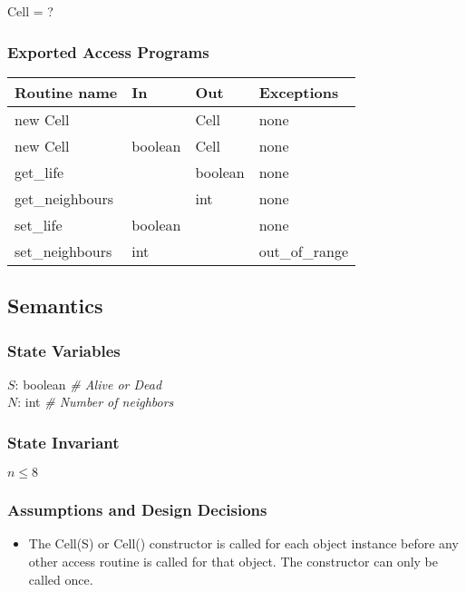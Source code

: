 \documentclass[12pt]{article}
\begin{document}
Cell = ?

\subsubsection* {Exported Access Programs}

\begin{tabular}{| l | l | l | p{5cm} |}
\hline
\textbf{Routine name} & \textbf{In} & \textbf{Out} & \textbf{Exceptions}\\
\hline
new Cell & & Cell & none\\
\hline
new Cell & boolean & Cell & none\\
\hline
get\_life & & boolean & none\\
\hline
get\_neighbours & & int & none\\
\hline
set\_life & boolean & & none\\
\hline
set\_neighbours & int & & out\_of\_range\\
\hline
\end{tabular}

\subsection* {Semantics}

\subsubsection* {State Variables}

$S$: boolean \textit{\# Alive or Dead}\\
$N$: int \textit{\# Number of neighbors}

\subsubsection* {State Invariant}

$n \leq 8$

\subsubsection* {Assumptions and Design Decisions}

\begin{itemize}
    \item The Cell(S) or Cell() constructor is called for each object instance before any other access routine is called for that object. The constructor can only be called once.
\end{itemize}
\end{document}
